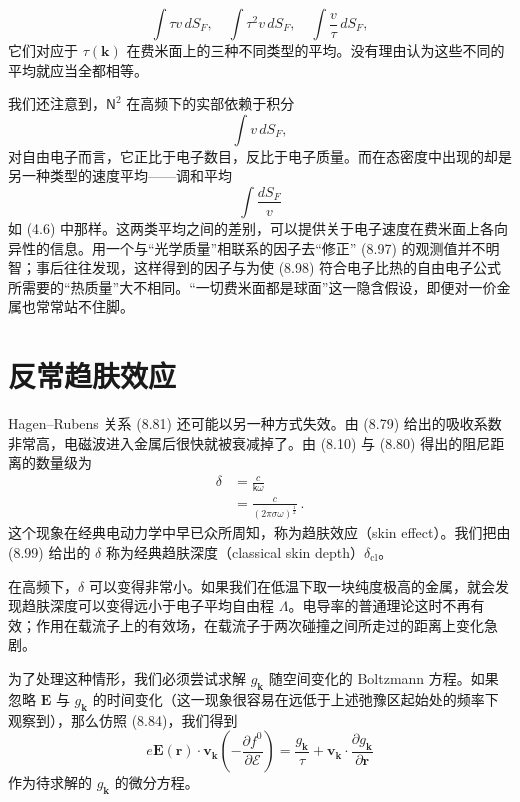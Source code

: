 \begin{equation*}
\int \tau v\,dS_F,\quad \int \tau^2 v\,dS_F,\quad \int \frac{v}{\tau}\,dS_F, \tag{8.96}
\end{equation*}
它们对应于 $\tau(\mathbf{k})$ 在费米面上的三种不同类型的平均。没有理由认为这些不同的平均就应当全都相等。

我们还注意到，$\mathsf{N}^2$ 在高频下的实部依赖于积分
\begin{equation*}
\int v\,dS_F, \tag{8.97}
\end{equation*}
对自由电子而言，它正比于电子数目，反比于电子质量。而在态密度中出现的却是另一种类型的速度平均——调和平均
\begin{equation*}
\int \frac{dS_F}{v} \tag{8.98}
\end{equation*}
如 (4.6) 中那样。这两类平均之间的差别，可以提供关于电子速度在费米面上各向异性的信息。用一个与“光学质量”相联系的因子去“修正” (8.97) 的观测值并不明智；事后往往发现，这样得到的因子与为使 (8.98) 符合电子比热的自由电子公式所需要的“热质量”大不相同。“一切费米面都是球面”这一隐含假设，即便对一价金属也常常站不住脚。

\section{反常趋肤效应}

Hagen–Rubens 关系 (8.81) 还可能以另一种方式失效。由 (8.79) 给出的吸收系数非常高，电磁波进入金属后很快就被衰减掉了。由 (8.10) 与 (8.80) 得出的阻尼距离的数量级为
\begin{align*}
\delta &= \frac{c}{\mathsf{k}\omega} \\
&= \frac{c}{(2\pi\sigma\omega)^{\frac{1}{2}}}\,. \tag{8.99}
\end{align*}
这个现象在经典电动力学中早已众所周知，称为趋肤效应（skin effect）。我们把由 (8.99) 给出的 $\delta$ 称为经典趋肤深度（classical skin depth）$\delta_{\mathrm{cl}}$。

在高频下，$\delta$ 可以变得非常小。如果我们在低温下取一块纯度极高的金属，就会发现趋肤深度可以变得远小于电子平均自由程 $\Lambda$。电导率的普通理论这时不再有效；作用在载流子上的有效场，在载流子于两次碰撞之间所走过的距离上变化急剧。

为了处理这种情形，我们必须尝试求解 $g_{\mathbf{k}}$ 随空间变化的 Boltzmann 方程。如果忽略 $\mathbf{E}$ 与 $g_{\mathbf{k}}$ 的时间变化（这一现象很容易在远低于上述弛豫区起始处的频率下观察到），那么仿照 (8.84)，我们得到
\begin{equation*}
e\mathbf{E}(\mathbf{r})\cdot\mathbf{v}_{\mathbf{k}}\left(-\frac{\partial f^0}{\partial\mathcal{E}}\right) = \frac{g_{\mathbf{k}}}{\tau} + \mathbf{v}_{\mathbf{k}}\cdot\frac{\partial g_{\mathbf{k}}}{\partial\mathbf{r}} \tag{8.100}
\end{equation*}
作为待求解的 $g_{\mathbf{k}}$ 的微分方程。

